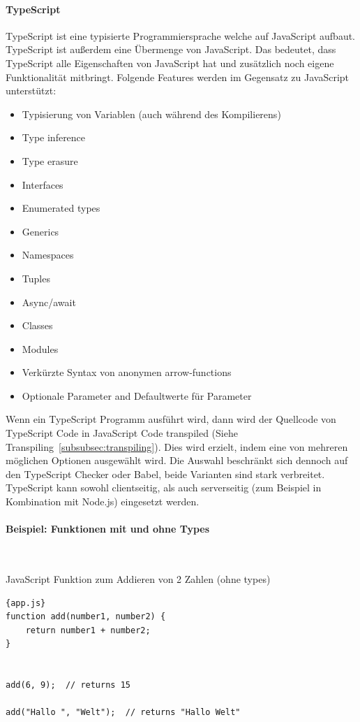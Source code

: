 \paragraph{TypeScript}
\label{TypeScript}
TypeScript ist eine typisierte Programmiersprache welche auf JavaScript aufbaut.
TypeScript ist außerdem eine Übermenge von JavaScript.
Das bedeutet, dass TypeScript alle Eigenschaften von JavaScript hat und zusätzlich noch eigene Funktionalität mitbringt.
Folgende Features werden im Gegensatz zu JavaScript unterstützt:

\begin{itemize}
    \item Typisierung von Variablen (auch während des Kompilierens)
    \item Type inference
    \item Type erasure
    \item Interfaces
    \item Enumerated types
    \item Generics
    \item Namespaces
    \item Tuples
    \item Async/await
    \item Classes
    \item Modules
    \item Verkürzte Syntax von anonymen arrow-functions
    \item Optionale Parameter and Defaultwerte für Parameter
\end{itemize}

Wenn ein TypeScript Programm ausführt wird, dann wird der Quellcode von TypeScript Code in JavaScript Code transpiled
(Siehe Transpiling~\ref{subsubsec:transpiling}).
Dies wird erzielt, indem eine von mehreren möglichen Optionen ausgewählt wird.
Die Auswahl beschränkt sich dennoch auf den TypeScript Checker oder Babel, beide Varianten sind stark verbreitet.
TypeScript kann sowohl clientseitig, als auch serverseitig (zum Beispiel in Kombination mit Node.js) eingesetzt werden.

\paragraph{Beispiel: Funktionen mit und ohne Types} \

JavaScript Funktion zum Addieren von 2 Zahlen (ohne types)
\begin{lstlisting}[label={lst:add-function-js}]{app.js}
function add(number1, number2) {
    return number1 + number2;
}


add(6, 9);  // returns 15

add("Hallo ", "Welt");  // returns "Hallo Welt"
\end{lstlisting}

